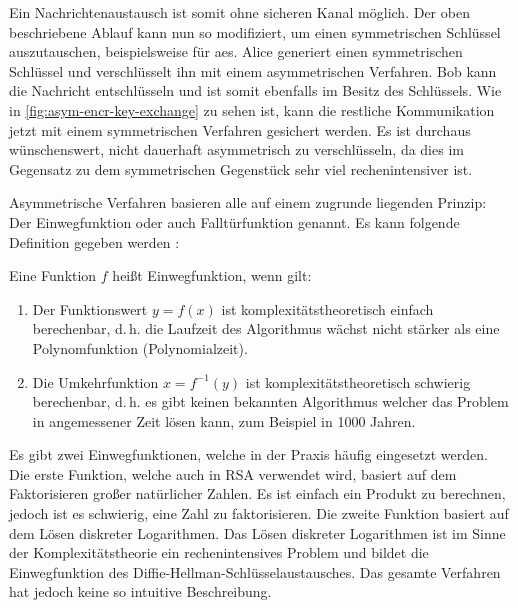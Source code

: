 

\noindent
Ein Nachrichtenaustausch ist somit ohne sicheren Kanal möglich. Der oben beschriebene
Ablauf kann nun so modifiziert, um einen symmetrischen Schlüssel auszutauschen, beispielsweise
für \acs{aes}. Alice generiert einen symmetrischen Schlüssel und verschlüsselt ihn mit einem
asymmetrischen Verfahren. Bob kann die Nachricht entschlüsseln und ist somit ebenfalls
im Besitz des Schlüssels. Wie in \autoref{fig:asym-encr-key-exchange} zu sehen ist,
kann die restliche Kommunikation jetzt mit einem symmetrischen
Verfahren gesichert werden. Es ist durchaus wünschenswert, nicht dauerhaft asymmetrisch
zu verschlüsseln, da dies im Gegensatz zu dem symmetrischen Gegenstück sehr viel
rechenintensiver ist.
\newpage



\noindent
Asymmetrische Verfahren basieren alle auf einem zugrunde liegenden Prinzip:
Der Einwegfunktion oder auch Falltürfunktion genannt. Es kann folgende
Definition gegeben werden \parencite[153]{BOOK:crypto}:

\begin{definition}[Einwegfunktion]
  Eine Funktion $f$ heißt Einwegfunktion, wenn gilt:
  \begin{enumerate}
    \item Der Funktionswert $y = f(x)$ ist komplexitätstheoretisch einfach berechenbar,
          d.\,h. die Laufzeit des Algorithmus wächst
          nicht stärker als eine Polynomfunktion (Polynomialzeit).
    \item Die Umkehrfunktion $x = f^{-1}(y)$ ist komplexitätstheoretisch schwierig berechenbar,
          d.\,h. es gibt keinen bekannten Algorithmus welcher das Problem in angemessener
          Zeit lösen kann, zum Beispiel in 1000 Jahren.
  \end{enumerate}
\end{definition}

\noindent
Es gibt zwei Einwegfunktionen, welche in der Praxis häufig eingesetzt werden.
Die erste Funktion, welche auch in RSA verwendet wird,
basiert auf dem Faktorisieren großer natürlicher Zahlen.
Es ist einfach ein Produkt zu berechnen, jedoch ist es schwierig, eine Zahl zu
faktorisieren. Die zweite Funktion basiert auf dem Lösen diskreter Logarithmen.
Das Lösen diskreter Logarithmen
ist im Sinne der Komplexitätstheorie ein rechenintensives Problem
und bildet die Einwegfunktion des
Diffie-Hellman-Schlüsselaustausches.
Das gesamte Verfahren hat jedoch keine so intuitive Beschreibung.

